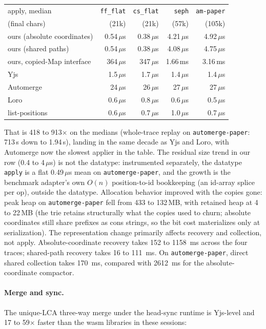 \documentclass[11pt]{article}
\newcommand{\code}[1]{\texttt{#1}}
\begin{document}
\begin{center}\small
\begin{tabular}{@{}lrrrr@{}}
\toprule
apply, median & \code{ff\_flat} & \code{cs\_flat} & \code{seph} & \code{am-paper} \\
(final chars) & (21k) & (21k) & (57k) & (105k) \\
\midrule
ours (absolute coordinates) & 0.54\,$\mu$s & 0.38\,$\mu$s & 4.21\,$\mu$s & 4.92\,$\mu$s \\
ours (shared paths) & 0.54\,$\mu$s & 0.38\,$\mu$s & 4.08\,$\mu$s & 4.75\,$\mu$s \\
ours, copied-Map interface & 364\,$\mu$s & 347\,$\mu$s & 1.66\,ms & 3.16\,ms \\
Yjs & 1.5\,$\mu$s & 1.7\,$\mu$s & 1.4\,$\mu$s & 1.4\,$\mu$s \\
Automerge & 24\,$\mu$s & 26\,$\mu$s & 27\,$\mu$s & 27\,$\mu$s \\
Loro & 0.6\,$\mu$s & 0.8\,$\mu$s & 0.6\,$\mu$s & 0.5\,$\mu$s \\
list-positions & 0.6\,$\mu$s & 0.7\,$\mu$s & 1.0\,$\mu$s & 0.7\,$\mu$s \\
\bottomrule
\end{tabular}
\end{center}

\noindent That is 418 to 913$\times$ on the medians (whole-trace replay
on \code{automerge-paper}: 713\,s down to 1.94\,s), landing in the same
decade as Yjs and Loro, with Automerge now the slowest applier in the
table. The residual size trend in our row (0.4 to 4\,$\mu$s) is not the
datatype: instrumented separately, the datatype \code{apply} is a flat
0.49\,$\mu$s mean on \code{automerge-paper}, and the growth is the
benchmark adapter's own $O(n)$ position-to-id bookkeeping (an id-array
splice per op), outside the datatype. Allocation behavior improved with
the copies gone: peak heap on \code{automerge-paper} fell from 433 to
132\,MB, with retained heap at 4 to 22\,MB (the trie retains
structurally what the copies used to churn; absolute coordinates still
share prefixes as cons strings, so the bit cost materializes only at
serialization). The representation change primarily affects recovery and
collection, not apply. Absolute-coordinate recovery takes 152 to 1158~ms
across the four traces; shared-path recovery takes 16 to 111~ms. On
\code{automerge-paper}, direct shared collection takes 170~ms, compared with
2612~ms for the absolute-coordinate compactor.

\paragraph{Merge and sync.} The unique-LCA three-way
merge under the head-sync runtime is Yjs-level and 17 to 59$\times$ faster
than the wasm libraries in these sessions:
\end{document}
